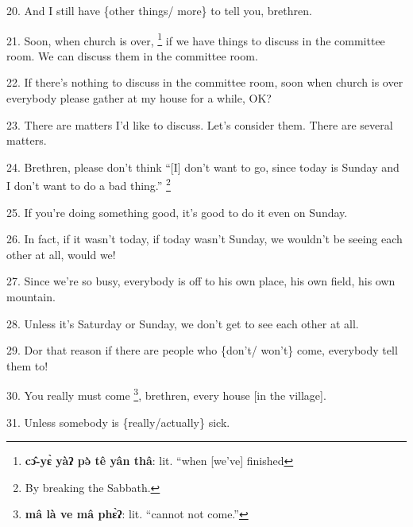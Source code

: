 20. And I still have \{other things/ more\} to tell you, brethren.

21. Soon, when church is over, \footnote{\textbf{cɔ̂-yɛ̀ yàʔ pə̀ tê yân thâ}: lit. ``when [we've] finished} if we have things to discuss in the committee
room. We can discuss them in the committee room.

22. If there's nothing to discuss in the committee room, soon when church is over
everybody please gather at my house for a while, OK?

23. There are matters I'd like to discuss. Let's consider them. There are several
matters.

24. Brethren, please don't think ``[I] don't want to go, since today is Sunday
and I don't want to do a bad thing.'' \footnote{By breaking the Sabbath.}

25. If you're doing something good, it's good to do it even on Sunday.

26. In fact, if it wasn't today, if today wasn't Sunday, we wouldn't be seeing
each other at all, would we!

27. Since we're so busy, everybody is off to his own place, his own field, his
own mountain.

28. Unless it's Saturday or Sunday, we don't get to see each other at all.

29. Dor that reason if there are people who \{don't/ won't\} come, everybody tell
them to!

30. You really must come \footnote{\textbf{mâ là ve mâ phɛ̀ʔ}: lit. ``cannot not come.''}, brethren, every house [in the village].

31. Unless somebody is \{really/actually\} sick.


